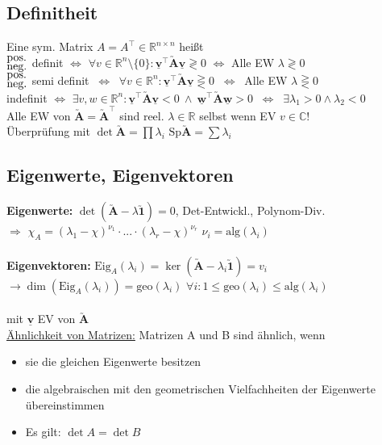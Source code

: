 \documentclass[6pt,a4paper]{scrartcl}
\newcommand{\eset}[1]{\ensuremath{\bigl\{#1\bigr\}}}											%
\newcommand{\ma}[1]{\ensuremath{\utilde{\boldsymbol {#1}}}}										%
\renewcommand{\vec}[1]{\ensuremath{\underline{\boldsymbol {#1}}}}								%
\renewcommand{\emph}[1]{\textbf{#1}}															%
\newcommand{\Ra}[0]{\ensuremath{\Rightarrow}}									%
\newcommand{\ra}[0]{\ensuremath{\rightarrow}} 									%
\begin{document}
\begin{multicols}{4}
\subsection{Definitheit}
Eine sym. Matrix $A = A^\top \in \mathbb R^{n\times n}$ heißt\\[0.3em]
$_{\text{\normalsize neg.}}^{\text{\normalsize pos.}}$ definit 
$ \Leftrightarrow$
$\forall v \in \mathbb R^n \setminus \eset{0} : \vec v^\top \ma A \vec v \gtrless 0$
$ \Leftrightarrow  $  Alle EW $\lambda \gtrless 0$\\
$_{\text{\normalsize neg.}}^{\text{\normalsize pos.}}$ semi definit $\ \Leftrightarrow\ $ $\forall v \in \mathbb R^n : \vec v^\top \ma A \vec v \gtreqless 0$ $\ \Leftrightarrow \ $  Alle EW $\lambda \gtreqless 0$\\
indefinit $\Leftrightarrow$
$\exists v,w \in \mathbb R^n: \vec v^\top
\ma A \vec v < 0 \ \land \ \vec w^\top \ma A \vec w > 0$ 
$\ \Leftrightarrow \ $  $\exists \lambda_1 > 0 \land \lambda_2 < 0$\\
Alle EW von $\ma A = \ma A^\top$ sind reel. $\lambda \in \mathbb R$ selbst wenn EV $v \in \mathbb C$!\\
Überprüfung mit $\det \ma A = \prod \lambda_i$ \qquad $\mathrm{Sp} \ma A = \sum \lambda_i$\\

\subsection{Eigenwerte, Eigenvektoren}
\emph{Eigenwerte:} $\det(\ma A - \lambda \ma 1) = 0$, Det-Entwickl., Polynom-Div. \\
$\Ra$ $\chi_A = (\lambda_1 - \chi)^{\nu_1} \cdot ... \cdot (\lambda_r - \chi)^{\nu_r}$ \quad $\nu_i = \mathrm{alg}(\lambda_i)$\\ \\
\emph{Eigenvektoren:} $\mathrm{Eig}_A (\lambda_i) = \ker(\ma A - \lambda_i \ma 1) = v_i$\\
$\ra \dim(\mathrm{Eig}_A (\lambda_i)) = \mathrm{geo}(\lambda_i)$ \quad $\forall i : 1 \le \mathrm{geo}(\lambda_i) \le \mathrm{alg}(\lambda_i)$\\ \\
\boxed{\ma A \vec v = \lambda \vec v} mit $\vec v$ EV von $\ma A$ \\
\underline{Ähnlichkeit von Matrizen:} Matrizen A und B sind ähnlich, wenn
\begin{itemize}
	\item sie die gleichen Eigenwerte besitzen
	\item die algebraischen mit den geometrischen Vielfachheiten der Eigenwerte übereinstimmen
	\item Es gilt: $\det A = \det B$
\end{itemize}


\end{multicols}
\end{document}
